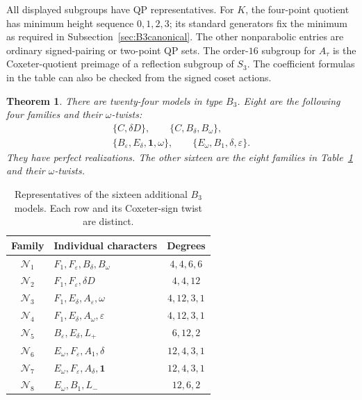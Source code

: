 \documentclass[11pt]{article}
\numberwithin{equation}{section}
\newtheorem{theorem}{Theorem}[section]
\theoremstyle{definition}
\newcommand{\ee}{\varepsilon}
\newcommand{\dd}{\delta}
\newcommand{\om}{\omega}
\newcommand{\one}{\mathbf 1}
\begin{document}
All displayed subgroups have QP representatives.
For \(K\), the four-point quotient has minimum height sequence \(0,1,2,3\); its standard generators fix the minimum as required in Subsection~\ref{sec:B3canonical}.
The other nonparabolic entries are ordinary signed-pairing or two-point QP sets.
The order-\(16\) subgroup for \(A_\tau\) is the Coxeter-quotient preimage of a reflection subgroup of \(S_3\).
The coefficient formulas in the table can also be checked from the signed coset actions.

\begin{theorem}\label{thm:B3list}
There are twenty-four models in type \(B_3\).
Eight are the following four families and their \(\om\)-twists:
\[
 \begin{gathered}
 \{C,\dd D\},\qquad
 \{C,B_\dd,B_\om\},\\
 \{B_\ee,E_\dd,\one,\om\},\qquad
 \{E_\om,B_1,\dd,\ee\}.
 \end{gathered}
 \]
They have perfect realizations.
The other sixteen are the eight families in Table~\ref{tab:B3extra} and their \(\om\)-twists.
\end{theorem}

\begin{table}[htbp]
\centering
\begin{tabular}{clc}
\toprule
Family&Individual characters&Degrees\\
\midrule
\(\mathscr N_1\)&\(F_1,F_\ee,B_\dd,B_\om\)&\(4,4,6,6\)\\
\(\mathscr N_2\)&\(F_1,F_\ee,\dd D\)&\(4,4,12\)\\
\(\mathscr N_3\)&\(F_1,E_\dd,A_\ee,\om\)&\(4,12,3,1\)\\
\(\mathscr N_4\)&\(F_1,E_\dd,A_\om,\ee\)&\(4,12,3,1\)\\
\(\mathscr N_5\)&\(B_\ee,E_\dd,L_+\)&\(6,12,2\)\\
\(\mathscr N_6\)&\(E_\om,F_\ee,A_1,\dd\)&\(12,4,3,1\)\\
\(\mathscr N_7\)&\(E_\om,F_\ee,A_\dd,\one\)&\(12,4,3,1\)\\
\(\mathscr N_8\)&\(E_\om,B_1,L_-\)&\(12,6,2\)\\
\bottomrule
\end{tabular}
\caption{Representatives of the sixteen additional \(B_3\) models. Each row and its Coxeter-sign twist are distinct.}
\label{tab:B3extra}
\end{table}
\end{document}
